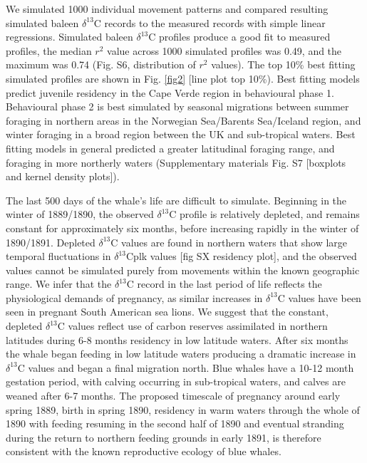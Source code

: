\documentclass[a4paper,12pt]{article}
\begin{document}
We simulated 1000 individual movement patterns and compared resulting simulated baleen $\delta^{13}$C records to the measured records with simple linear regressions. 
Simulated baleen $\delta^{13}$C profiles produce a good fit to measured profiles, the median $r^2$ value across 1000 simulated profiles was 0.49, and the maximum was 0.74 (Fig. S6, distribution of $r^2$ values). 
The top 10\% best fitting simulated profiles are shown in Fig. \ref{fig2} [line plot top 10\%). 
Best fitting models predict juvenile residency in the Cape Verde region in behavioural phase 1. 
Behavioural phase 2 is best simulated by seasonal migrations between summer foraging in northern areas in the Norwegian Sea/Barents Sea/Iceland region, and winter foraging in a broad region between the UK and sub-tropical waters. 
Best fitting models in general predicted a greater latitudinal foraging range, and foraging in more northerly waters (Supplementary materials Fig. S7 [boxplots and kernel density plots]).

The last 500 days of the whale's life are difficult to simulate. 
Beginning in the winter of 1889/1890, the observed $\delta^{13}$C profile is relatively depleted, and remains constant for approximately six months, before increasing rapidly in the winter of 1890/1891. 
Depleted $\delta^{13}$C values are found in northern waters that show large temporal fluctuations in $\delta^{13}$Cplk values [fig SX residency plot], and the observed values cannot be simulated purely from movements within the known geographic range.
We infer that the $\delta^{13}$C record in the last period of life reflects the physiological demands of pregnancy, as similar increases in $\delta^{13}$C values have been seen in pregnant South American sea lions\cite{cardona2017temporal}. 
We suggest that the constant, depleted $\delta^{13}$C values reflect use of carbon reserves assimilated in northern latitudes during 6-8 months residency in low latitude waters. 
After six months the whale began feeding in low latitude waters producing a dramatic increase in $\delta^{13}$C values and began a final migration north. 
Blue whales have a 10-12 month gestation period, with calving occurring in sub-tropical waters, and calves are weaned after 6-7 months\cite{handbook}. 
The proposed timescale of pregnancy around early spring 1889, birth in spring 1890, residency in warm waters through the whole of 1890 with feeding resuming in the second half of 1890 and eventual stranding during the return to northern feeding grounds in early 1891, is therefore consistent with the known reproductive ecology of blue whales. 
\end{document}
